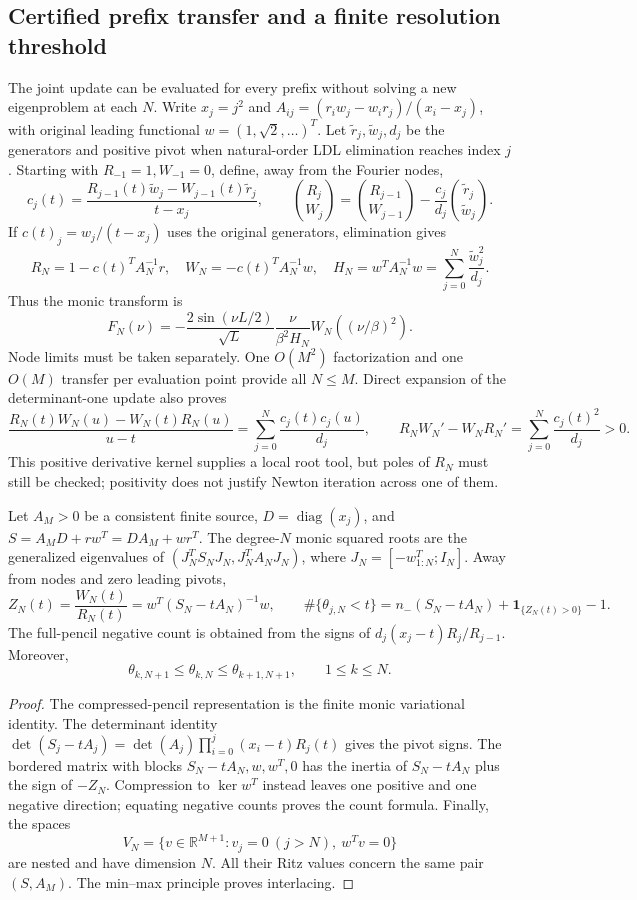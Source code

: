 \subsection{Certified prefix transfer and a finite resolution threshold}
\label{ssec:certified-prefix-transfer}

The joint update can be evaluated for every prefix without solving a
new eigenproblem at each $N$. Write $x_j=j^2$ and
$A_{ij}=(r_iw_j-w_ir_j)/(x_i-x_j)$, with original leading functional
$w=(1,\sqrt2,\ldots)^T$. Let $\widetilde r_j,\widetilde w_j,d_j$
be the generators and positive pivot when natural-order LDL elimination
reaches index $j$. Starting with $R_{-1}=1,W_{-1}=0$, define, away from
the Fourier nodes,
\[
 c_j(t)=\frac{R_{j-1}(t)\widetilde w_j-W_{j-1}(t)\widetilde r_j}{t-x_j},
 \qquad
 \binom{R_j}{W_j}=\binom{R_{j-1}}{W_{j-1}}
       -\frac{c_j}{d_j}\binom{\widetilde r_j}{\widetilde w_j}.
\]
If $c(t)_j=w_j/(t-x_j)$ uses the original generators, elimination gives
\[
 R_N=1-c(t)^TA_N^{-1}r,\quad W_N=-c(t)^TA_N^{-1}w,
 \quad H_N=w^TA_N^{-1}w=\sum_{j=0}^N\frac{\widetilde w_j^2}{d_j}.
\]
Thus the monic transform is
\[
 F_N(\nu)=-\frac{2\sin(\nu L/2)}{\sqrt L}
               \frac{\nu}{\beta^2 H_N}W_N((\nu/\beta)^2).
\]
Node limits must be taken separately. One $O(M^2)$ factorization and
one $O(M)$ transfer per evaluation point provide all $N\le M$.
Direct expansion of the determinant-one update also proves
\[
 \frac{R_N(t)W_N(u)-W_N(t)R_N(u)}{u-t}
       =\sum_{j=0}^N\frac{c_j(t)c_j(u)}{d_j},\qquad
 R_NW_N'-W_NR_N'=\sum_{j=0}^N\frac{c_j(t)^2}{d_j}>0.
\]
This positive derivative kernel supplies a local root tool, but poles
of $R_N$ must still be checked; positivity does not justify Newton
iteration across one of them.

\begin{proposition}
\label{prop:prefix-count-interlacing}
Let $A_M>0$ be a consistent finite source, $D=\operatorname{diag}(x_j)$,
and $S=A_MD+rw^T=DA_M+wr^T$. The degree-$N$ monic squared roots are
the generalized eigenvalues of $(J_N^TS_NJ_N,J_N^TA_NJ_N)$, where
$J_N=[-w_{1:N}^T;I_N]$. Away from nodes and zero leading pivots,
\[
 Z_N(t)=\frac{W_N(t)}{R_N(t)}=w^T(S_N-tA_N)^{-1}w,
 \qquad
 \#\{\theta_{j,N}<t\}=n_-(S_N-tA_N)+\boldsymbol1_{\{Z_N(t)>0\}}-1.
\]
The full-pencil negative count is obtained from the signs of
$d_j(x_j-t)R_j/R_{j-1}$. Moreover,
\[
 \theta_{k,N+1}\le\theta_{k,N}\le\theta_{k+1,N+1},\qquad 1\le k\le N.
\]
\end{proposition}
\begin{proof}
The compressed-pencil representation is the finite monic variational
identity. The determinant identity
$\det(S_j-tA_j)=\det(A_j)\prod_{i=0}^j(x_i-t)R_j(t)$ gives the pivot
signs. The bordered matrix with blocks $S_N-tA_N,w,w^T,0$ has the
inertia of $S_N-tA_N$ plus the sign of $-Z_N$. Compression to
$\ker w^T$ instead leaves one positive and one negative direction;
equating negative counts proves the count formula. Finally, the spaces
\[
 V_N=\{v\in\mathbb R^{M+1}:v_j=0\ (j>N),\ w^Tv=0\}
\]
are nested and have dimension $N$. All their Ritz values concern the
same pair $(S,A_M)$. The min--max principle proves interlacing.
\end{proof}

